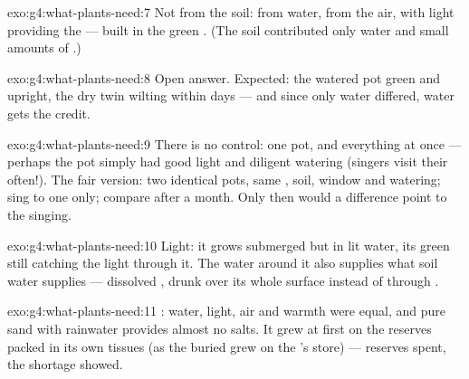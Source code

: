 \begin{solution}{exo:g4:what-plants-need:7}
Not from the soil: from water, from the air, with light
providing the  --- built in the green . (The soil
contributed only water and small amounts of .)
\end{solution}

\begin{solution}{exo:g4:what-plants-need:8}
Open answer. Expected: the watered pot green and upright, the
dry twin wilting within days --- and since only water differed,
water gets the credit.
\end{solution}

\begin{solution}{exo:g4:what-plants-need:9}
There is no control: one pot, and everything at once ---
perhaps the pot simply had good light and diligent watering
(singers visit their  often!). The fair version: two
identical pots, same , soil, window and watering; sing to
one only; compare after a month. Only then would a difference
point to the singing.
\end{solution}

\begin{solution}{exo:g4:what-plants-need:10}
Light: it grows submerged but in lit water, its green 
still catching the light through it. The water around it also
supplies what soil water supplies --- dissolved ,
drunk over its whole surface instead of through .
\end{solution}

\begin{solution}{exo:g4:what-plants-need:11}
: water, light, air and warmth were equal, and
pure sand with rainwater provides almost no salts. It grew at
first on the reserves packed in its own tissues (as the buried
 grew on the 's store) --- reserves spent, the
shortage showed.
\end{solution}
